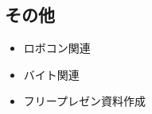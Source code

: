 \documentclass[uplatex, onecolumn, 10pt]{jsarticle}
\begin{document}
\subsection*{その他}
\begin{itemize}
	\item ロボコン関連
    \item バイト関連
    \item フリープレゼン資料作成
\end{itemize}
\end{document}
